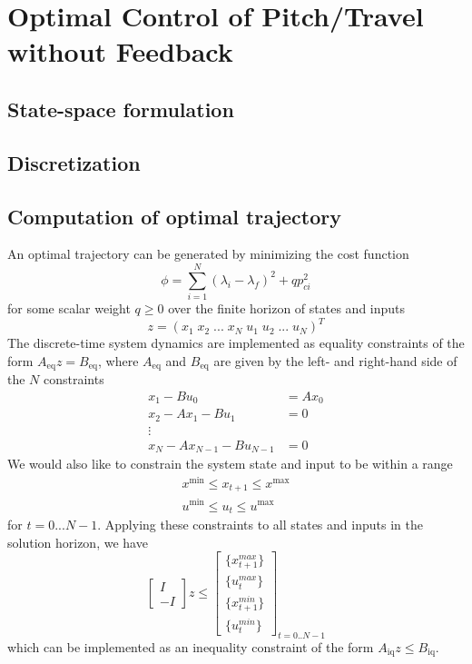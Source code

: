 \section{Optimal Control of Pitch/Travel without Feedback}\label{sec:prob2}

\subsection{State-space formulation}

\subsection{Discretization}

\subsection{Computation of optimal trajectory}

An optimal trajectory can be generated by minimizing the cost function
\begin{equation}
	\label{eq:trajectory_cost}
	\phi = \sum_{i=1}^{N}(\lambda_i - \lambda_f)^2 + qp_{ci}^2
\end{equation}
for some scalar weight $q \geq 0$ over the finite horizon of states and inputs
\begin{equation}
	z = (x_1 \; x_2 \; ... \; x_N \; u_1 \; u_2 \; ... \; u_N)^T
\end{equation}
The discrete-time system dynamics are implemented as equality constraints of the form $A_{\text{eq}}z = B_{\text{eq}}$, where $A_{\text{eq}}$ and $B_{\text{eq}}$ are given by the left- and right-hand side of the $N$ constraints
\begin{align*}
	x_1 - Bu_0        &= Ax_0 \\
	x_2 - Ax_1 - Bu_1 &= 0    \\
	\vdots                    \\
	x_N - Ax_{N-1} - Bu_{N-1} &= 0
\end{align*}
We would also like to constrain the system state and input to be within a range
\begin{align}
	x^{\text{min}} \leq x_{t+1} \leq x^{\text{max}} \\
	u^{\text{min}} \leq u_t \leq u^{\text{max}}
\end{align}
for $t = 0...N-1$. Applying these constraints to all states and inputs in the solution horizon, we have
\begin{equation}
	\begin{bmatrix} I \\ -I \end{bmatrix} z
	\leq
	\begin{bmatrix}
	\{x_{t+1}^{max}\} \\
	\{u_t^{max}\} \\
	\{x_{t+1}^{min}\} \\
	\{u_t^{min}\}
	\end{bmatrix}_{t=0..N-1}
\end{equation}
which can be implemented as an inequality constraint of the form $A_{\text{iq}} z \leq B_{\text{iq}}$.


